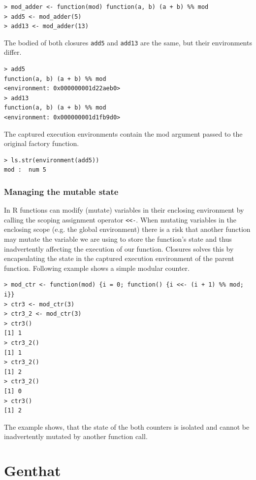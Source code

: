 \documentclass[thesis=B,english]{FITthesis}[2012/10/20]
\begin{document}
\begin{verbatim}
> mod_adder <- function(mod) function(a, b) (a + b) %% mod
> add5 <- mod_adder(5)
> add13 <- mod_adder(13)
\end{verbatim}

The bodied of both closures \verb|add5| and \verb|add13| are the same, but their environments differ.

\begin{verbatim}
> add5
function(a, b) (a + b) %% mod
<environment: 0x000000001d22aeb0>
> add13
function(a, b) (a + b) %% mod
<environment: 0x000000001d1fb9d0>
\end{verbatim}

The captured execution environments contain the mod argument passed to the original factory function.

\begin{verbatim}
> ls.str(environment(add5))
mod :  num 5
\end{verbatim}

\subsection{Managing the mutable state} 
In R functions can modify (mutate) variables in their enclosing environment by calling the scoping assignment operator \verb|<<-|. When mutating variables in the enclosing scope (e.g. the global environment) there is a risk that another function may mutate the variable we are using to store the function’s state and thus inadvertently affecting the execution of our function. Closures solves this by encapsulating the state in the captured execution environment of the parent function. Following example shows a simple modular counter.

\begin{verbatim}
> mod_ctr <- function(mod) {i = 0; function() {i <<- (i + 1) %% mod; i}}
> ctr3 <- mod_ctr(3)
> ctr3_2 <- mod_ctr(3)
> ctr3()
[1] 1
> ctr3_2()
[1] 1
> ctr3_2()
[1] 2
> ctr3_2()
[1] 0
> ctr3()
[1] 2
\end{verbatim}

The example shows, that the state of the both counters is isolated and cannot be inadvertently mutated by another function call.

\chapter{Genthat}
\end{document}
